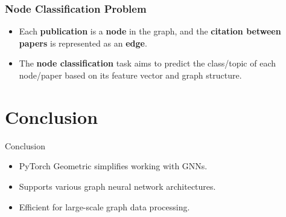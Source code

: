 \documentclass{beamer}
\begin{document}
\begin{frame}
\frametitle{Node Classification Problem}

\begin{itemize}
    \item Each \textbf{publication} is a \textbf{node} in the graph, and the \textbf{citation between papers} is represented as an \textbf{edge}.
    \item The \textbf{node classification} task aims to predict the class/topic of each node/paper based on its feature vector and graph structure.
\end{itemize}

\end{frame}

\section{Conclusion}
\begin{frame}{Conclusion}
    \begin{itemize}
        \item PyTorch Geometric simplifies working with GNNs.
        \item Supports various graph neural network architectures.
        \item Efficient for large-scale graph data processing.
    \end{itemize}
\end{frame}
\end{document}
